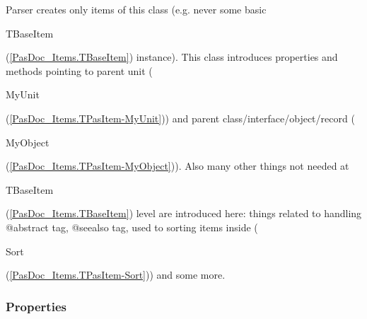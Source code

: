 \documentclass{report}
\begin{document}
Parser creates only items of this class (e.g. never some basic \begin{ttfamily}TBaseItem\end{ttfamily}(\ref{PasDoc_Items.TBaseItem}) instance). This class introduces properties and methods pointing to parent unit (\begin{ttfamily}MyUnit\end{ttfamily}(\ref{PasDoc_Items.TPasItem-MyUnit})) and parent class/interface/object/record (\begin{ttfamily}MyObject\end{ttfamily}(\ref{PasDoc_Items.TPasItem-MyObject})). Also many other things not needed at \begin{ttfamily}TBaseItem\end{ttfamily}(\ref{PasDoc_Items.TBaseItem}) level are introduced here: things related to handling @abstract tag, @seealso tag, used to sorting items inside (\begin{ttfamily}Sort\end{ttfamily}(\ref{PasDoc_Items.TPasItem-Sort})) and some more.\subsubsection*{\large{\textbf{Properties}}\normalsize\hspace{1ex}\hfill}
\end{document}
